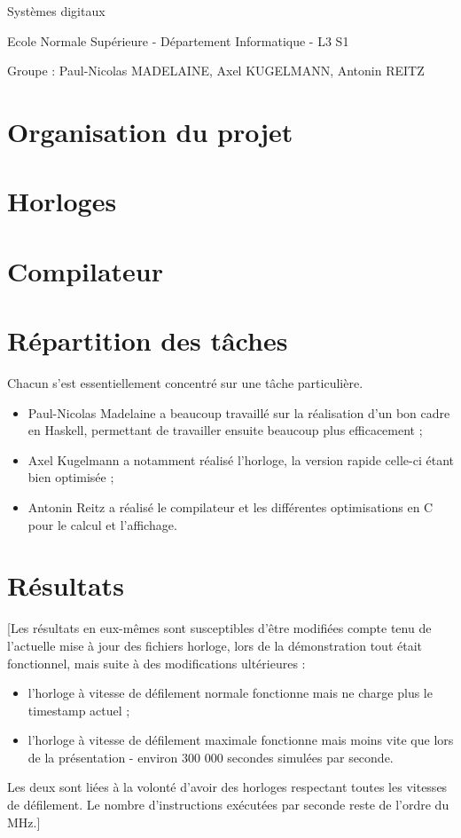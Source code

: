 \documentclass[a4paper,12pt,twoside]{article}
\begin{document}
\begin{center}
{\Huge Systèmes digitaux}
\end{center}
\begin{center}
{\Large Ecole Normale Supérieure - Département Informatique - L3 S1}
\end{center}

Groupe : Paul-Nicolas MADELAINE, Axel KUGELMANN, Antonin REITZ

\section{Organisation du projet}



\section{Horloges}



\section{Compilateur}



\section{Répartition des tâches}

Chacun s'est essentiellement concentré sur une tâche particulière.
\begin{itemize}
\item Paul-Nicolas Madelaine a beaucoup travaillé sur la réalisation d'un bon cadre en Haskell, permettant de travailler ensuite beaucoup plus efficacement ;
\item Axel Kugelmann a notamment réalisé l'horloge, la version rapide celle-ci étant bien optimisée ;
\item Antonin Reitz a réalisé le compilateur et les différentes optimisations en C pour le calcul et l'affichage.
\end{itemize}

\section{Résultats}

[Les résultats en eux-mêmes sont susceptibles d'être modifiées compte tenu de l'actuelle mise à jour des fichiers horloge, lors de la démonstration tout était fonctionnel, mais suite à des modifications ultérieures :
\begin{itemize}
\item l'horloge à vitesse de défilement normale fonctionne mais ne charge plus le timestamp actuel ;
\item l'horloge à vitesse de défilement maximale fonctionne mais moins vite que lors de la présentation - environ 300 000 secondes simulées par seconde.
\end{itemize}
Les deux sont liées à la volonté d'avoir des horloges respectant toutes les vitesses de défilement.
Le nombre d'instructions exécutées par seconde reste de l'ordre du MHz.]
\end{document}
